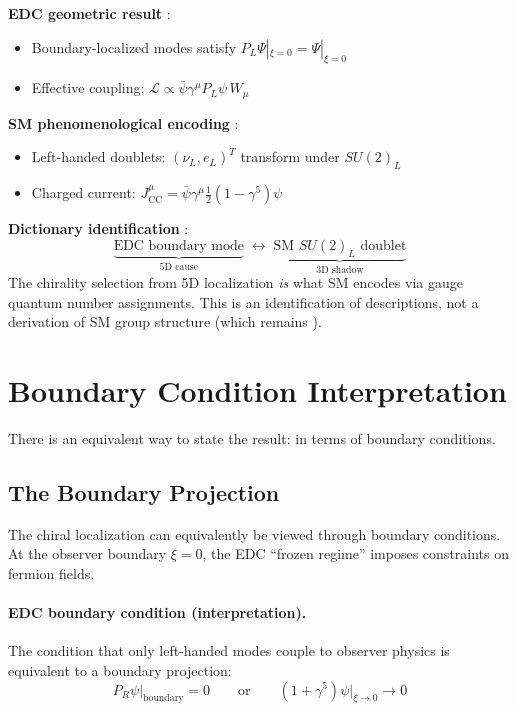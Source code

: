 \begin{tcolorbox}[colback=blue!5!white, colframe=blue!50!black,
    title=\textbf{Dictionary: EDC Chirality $\leftrightarrow$ SM V–A}]
\textbf{EDC geometric result} \tagDc{}:
\begin{itemize}[nosep]
\item Boundary-localized modes satisfy $P_L \Psi|_{\xi=0} = \Psi|_{\xi=0}$
\item Effective coupling: $\mathcal{L} \propto \bar\psi \gamma^\mu P_L \psi \, W_\mu$
\end{itemize}

\textbf{SM phenomenological encoding} \tagBL{}:
\begin{itemize}[nosep]
\item Left-handed doublets: $(\nu_L, e_L)^T$ transform under $SU(2)_L$
\item Charged current: $J^\mu_{\text{CC}} = \bar\psi \gamma^\mu \tfrac{1}{2}(1-\gamma^5) \psi$
\end{itemize}

\textbf{Dictionary identification} \tagDc{}:
\[
\underbrace{\text{EDC boundary mode}}_{\text{5D cause}} \;\longleftrightarrow\; \underbrace{\text{SM } SU(2)_L \text{ doublet}}_{\text{3D shadow}}
\]
The chirality selection from 5D localization \emph{is} what SM encodes via gauge
quantum number assignments. This is an identification of descriptions, not a
derivation of SM group structure (which remains \tagOpen{}).
\end{tcolorbox}

\section{Boundary Condition Interpretation}
\label{sec:ch9_boundary}

There is an equivalent way to state the result: in terms of boundary conditions.

\subsection{The Boundary Projection}

The chiral localization can equivalently be viewed through boundary conditions.
At the observer boundary $\xi = 0$, the EDC ``frozen regime'' imposes constraints
on fermion fields.

\paragraph{EDC boundary condition (interpretation).}
The condition that only left-handed modes couple to observer physics is
equivalent to a boundary projection:
\begin{equation}
    P_R \psi\big|_{\text{boundary}} = 0
    \qquad \text{or} \qquad
    (1 + \gamma^5) \psi\big|_{\xi \to 0} \to 0
    \label{eq:ch9_bc}
\end{equation}

